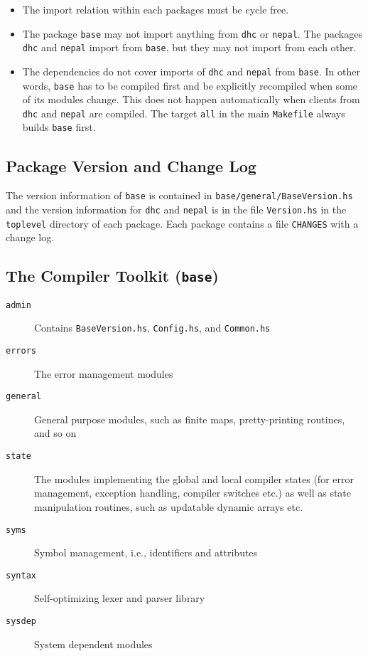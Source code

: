 \documentclass{report}
\newcommand{\code}[1]{\texttt{#1}}
\begin{document}
\begin{itemize}
\item The import relation within each packages must be cycle free.
\item The package \code{base} may not import anything from \code{dhc} or
  \code{nepal}.  The packages \code{dhc} and \code{nepal} import from
  \code{base}, but they may not import from each other.
\item The dependencies do not cover imports of \code{dhc} and \code{nepal}
  from \code{base}.  In other words, \code{base} has to be compiled first and
  be explicitly recompiled when some of its modules change.  This does not
  happen automatically when clients from \code{dhc} and \code{nepal} are
  compiled.  The target \code{all} in the main \code{Makefile} always builds
  \code{base} first.
\end{itemize}

\subsection{Package Version and Change Log}

The version information of \code{base} is contained in
\code{base/general/BaseVersion.hs} and the version information for \code{dhc}
and \code{nepal} is in the file \code{Version.hs} in the \code{toplevel}
directory of each package.  Each package contains a file \code{CHANGES} with a 
change log.

\subsection{The Compiler Toolkit (\code{base})}

\begin{description}
\item[\code{admin}] Contains \code{BaseVersion.hs}, \code{Config.hs}, and
  \code{Common.hs}
\item[\code{errors}] The error management modules
\item[\code{general}] General purpose modules, such as finite maps,
  pretty-printing routines, and so on
\item[\code{state}] The modules implementing the global and local compiler
  states (for error management, exception handling, compiler switches etc.) as
  well as state manipulation routines, such as updatable dynamic arrays etc.
\item[\code{syms}] Symbol management, i.e., identifiers and attributes
\item[\code{syntax}] Self-optimizing lexer and parser library
\item[\code{sysdep}] System dependent modules
\end{description}
\end{document}

